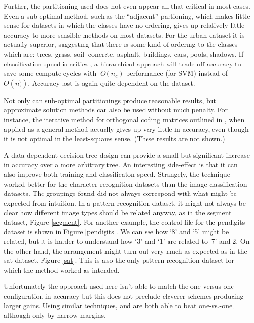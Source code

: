 Further, the partitioning used does not even appear all that
critical in most cases.
Even a sub-optimal method, such as the ``adjacent'' partioning, which makes
little sense for datasets in which the classes have no ordering,
gives up relatively little accuracy to more sensible methods on most datasets.
For the urban dataset it is actually superior, suggesting that there is
some kind of ordering to the classes which are: trees, grass, soil, concrete,
asphalt, buildings, cars, pools, shadows.
If classification speed is critical, a hierarchical approach will trade 
off accuracy to save some compute cycles with 
$~O(n_c)$ performance (for SVM) instead of $O(n_c^2)$.
Accuracy lost is again quite dependent on the dataset.

Not only can sub-optimal partitionings produce reasonable results, 
but approximate solution methods can also be used without much penalty.
For instance, the iterative method for orthogonal coding matrices
outlined in \citet{Mills2017}, when applied as a general method
actually gives up very little in accuracy,
even though it is not optimal in the least-squares sense.
(These results are not shown.)

A data-dependent decision tree design can provide a small but significant
increase in accuracy over a more arbitrary tree.
An interesting side-effect is
that it can also improve both training and classificaton speed.
Strangely, the technique worked better for the character recognition datasets than
the image classification datasets.
The groupings found did not always correspond with what might be
expected from intuition.
In a pattern-recognition dataset, it might not always be clear  
how different image types should be related anyway, as in
the segment dataset, Figure \ref{segment}.
For another example, the control file for the pendigits dataset is shown in Figure \ref{pendigits}.
We can see how `8' and `5' might be related, but it is harder to
understand how `3' and `1' are related to '7' and 2.
On the other hand, the arrangement might turn out very much as
expected as in the sat dataset, Figure \ref{sat}.
This is also the only pattern-recognition dataset for which the method 
worked as intended.

Unfortunately the approach used here isn't able to match the one-versus-one 
configuration in accuracy but
this does not preclude cleverer schemes producing larger gains.
Using similar techniques, \citet{Benabdeslem_Bennani2006} and \citet{Zhou_etal2008} are both able to beat one-vs.-one, although only by narrow margins.

